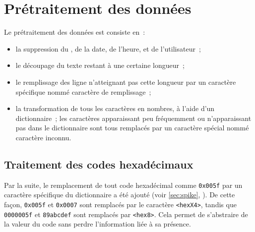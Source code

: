 \pagebreak
\section{Prétraitement des données}\label{def_dict_papud}
Le prétraitement des données est consiste en~:
\begin{itemize}
	\item la suppression du , de la date, de l'heure, et de l'utilisateur~;
	\item le découpage du texte restant à une certaine longueur~;
	\item le remplissage des ligne n'atteignant pas cette longueur par un caractère spécifique nommé caractère de remplissage~;
	\item la transformation de tous les caractères en nombres, à l'aide d'un dictionnaire~; les caractères apparaissant peu fréquemment ou n'apparaissant pas dans le dictionnaire sont tous remplacés par un caractère spécial nommé \og caractère inconnu\fg{}.
\end{itemize}

\subsection{Traitement des codes hexadécimaux}\label{hex}
Par la suite, le remplacement de tout code hexadécimal comme \lstinline|0x005f| par un caractère spécifique du dictionnaire a été ajouté (voir \autoref{sec:spike}, ).
De cette façon, \lstinline|0x005f| et \lstinline|0x0007| sont remplacés par le caractère  \lstinline|<hexX4>|, tandis que  \lstinline|0000005f| et  \lstinline|89abcdef| sont remplacés par  \lstinline|<hex8>|.
Cela permet de s'abstraire de la valeur du code sans perdre l'information liée à sa présence.

